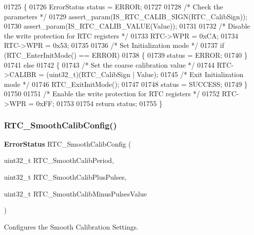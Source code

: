 \begin{DoxyCode}
01725 \{
01726   ErrorStatus status = ERROR;
01727    
01728   \textcolor{comment}{/* Check the parameters */}
01729   assert_param(IS_RTC_CALIB_SIGN(RTC\_CalibSign));
01730   assert_param(IS_RTC_CALIB_VALUE(Value)); 
01731 
01732   \textcolor{comment}{/* Disable the write protection for RTC registers */}
01733   RTC->WPR = 0xCA;
01734   RTC->WPR = 0x53;
01735 
01736   \textcolor{comment}{/* Set Initialization mode */}
01737   \textcolor{keywordflow}{if} (RTC_EnterInitMode() == ERROR)
01738   \{
01739     status = ERROR;
01740   \} 
01741   \textcolor{keywordflow}{else}
01742   \{
01743     \textcolor{comment}{/* Set the coarse calibration value */}
01744     RTC->CALIBR = (uint32\_t)(RTC\_CalibSign | Value);
01745     \textcolor{comment}{/* Exit Initialization mode */}
01746     RTC_ExitInitMode();
01747     
01748     status = SUCCESS;
01749   \} 
01750 
01751   \textcolor{comment}{/* Enable the write protection for RTC registers */}
01752   RTC->WPR = 0xFF; 
01753   
01754   \textcolor{keywordflow}{return} status;
01755 \}
\end{DoxyCode}
\mbox{\label{group__RTC__Group7_ga91a28dcc7d45340a469dd8b8c029f841}} 
\subsubsection{R\+T\+C\+\_\+\+Smooth\+Calib\+Config()}
{\footnotesize\ttfamily \textbf{ Error\+Status} R\+T\+C\+\_\+\+Smooth\+Calib\+Config (\begin{DoxyParamCaption}\item[{uint32\+\_\+t}]{R\+T\+C\+\_\+\+Smooth\+Calib\+Period,  }\item[{uint32\+\_\+t}]{R\+T\+C\+\_\+\+Smooth\+Calib\+Plus\+Pulses,  }\item[{uint32\+\_\+t}]{R\+T\+C\+\_\+\+Smouth\+Calib\+Minus\+Pulses\+Value }\end{DoxyParamCaption})}



Configures the Smooth Calibration Settings. 


